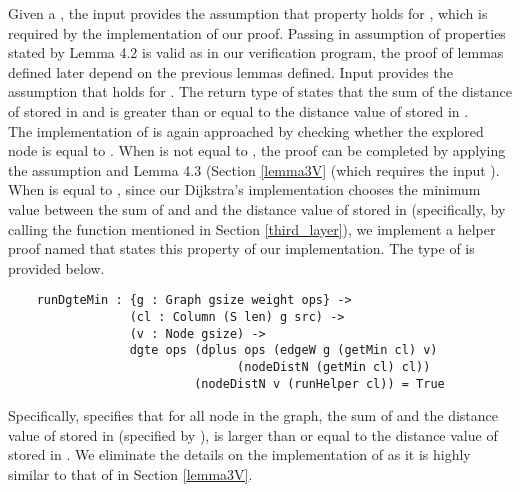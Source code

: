 Given a , the input  provides the assumption that property  holds for , which is required by the implementation of our proof. Passing in assumption of properties stated by Lemma 4.2 is valid as in our verification program, the proof of lemmas defined later depend on the previous lemmas defined. Input  provides the assumption that  holds for . The return type of  states that the sum of the distance of  stored in  and  is greater than or equal to the distance value of  stored in . 
\\

The implementation of  is again approached by checking whether the explored node  is equal to . When  is not equal to , the proof can be completed by applying the assumption  and Lemma 4.3  (Section \ref{lemma3V} (which requires the input ). 
\\

When  is equal to , since our Dijkstra's implementation chooses the minimum value between the sum of  and  and the distance value of  stored in  (specifically, by calling the  function mentioned in Section \ref{third_layer}), we implement a helper proof named  that states this property of our implementation. The type of  is provided below. 
\begin{lstlisting}
	runDgteMin : {g : Graph gsize weight ops} ->
	             (cl : Column (S len) g src) ->
	             (v : Node gsize) ->
	             dgte ops (dplus ops (edgeW g (getMin cl) v) 
	             				(nodeDistN (getMin cl) cl))
	                      (nodeDistN v (runHelper cl)) = True
\end{lstlisting}

Specifically,  specifies that for all node  in the graph, the sum of  and the distance value of  stored in (specified by ), is larger than or equal to the distance value of  stored in . We eliminate the details on the implementation of  as it is highly similar to that of  in Section \ref{lemma3V}. 
\\

